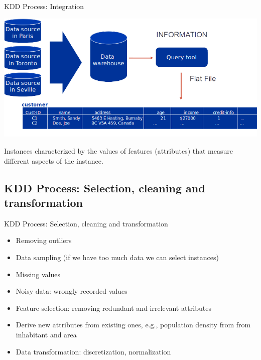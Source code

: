 \documentclass{beamer}
\begin{document}
\begin{frame}{KDD Process: Integration}

\begin{center}
\includegraphics[width=.8\textwidth]{figs/DataIntegration}
\end{center}

Instances characterized by the values of features (attributes) that measure
different aspects of the instance.

\end{frame}

\subsection{KDD Process: Selection, cleaning and transformation}

\begin{frame}{KDD Process: Selection, cleaning and transformation}

\begin{itemize}
 \item Removing outliers
 \item Data sampling (if we have too much data we can select instances)
 \item Missing values
 \item Noisy data: wrongly recorded values
 \item Feature selection: removing redundant and irrelevant attributes
 \item Derive new attributes from existing ones, e.g., population density from from inhabitant and area
 \item Data transformation: discretization, normalization
\end{itemize}


\end{frame}
\end{document}
